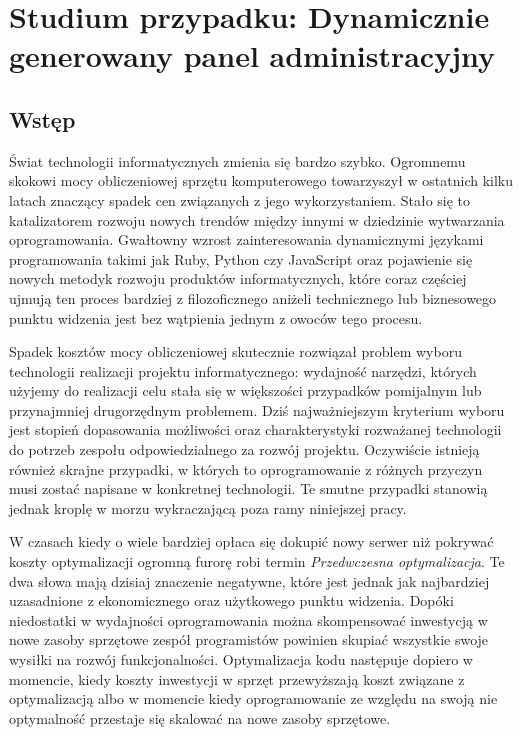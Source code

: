 
\chapter[Studium przypadku: Dynamicznie generowany panel administracyjny]{Studium przypadku: Dynamicznie generowany panel administracyjny}
  \section{Wstęp}
  Świat technologii informatycznych zmienia się bardzo szybko. Ogromnemu skokowi mocy obliczeniowej sprzętu komputerowego towarzyszył w ostatnich kilku latach znaczący spadek cen związanych z jego wykorzystaniem. Stało się to katalizatorem rozwoju nowych trendów między innymi w dziedzinie wytwarzania oprogramowania. Gwałtowny wzrost zainteresowania dynamicznymi językami programowania takimi jak Ruby, Python czy JavaScript oraz pojawienie się nowych metodyk rozwoju produktów informatycznych, które coraz częściej ujmują ten proces bardziej z filozoficznego aniżeli technicznego lub biznesowego punktu widzenia jest bez wątpienia jednym z owoców tego procesu.
  
  Spadek kosztów mocy obliczeniowej skutecznie rozwiązał problem wyboru technologii realizacji projektu informatycznego: wydajność narzędzi, których użyjemy do realizacji celu stała się w większości przypadków pomijalnym lub przynajmniej drugorzędnym problemem. Dziś najważniejszym kryterium wyboru jest stopień dopasowania możliwości oraz charakterystyki rozważanej technologii do potrzeb zespołu odpowiedzialnego za rozwój projektu. Oczywiście istnieją również skrajne przypadki, w których to oprogramowanie z różnych przyczyn musi zostać napisane w konkretnej technologii. Te smutne przypadki stanowią jednak kroplę w morzu wykraczającą poza ramy niniejszej pracy.
  
  W czasach kiedy o wiele bardziej opłaca się dokupić nowy serwer niż pokrywać koszty optymalizacji ogromną furorę robi termin \emph{Przedwczesna optymalizacja}. Te dwa słowa mają dzisiaj znaczenie negatywne, które jest jednak jak najbardziej uzasadnione z ekonomicznego oraz użytkowego punktu widzenia. Dopóki niedostatki w wydajności oprogramowania można skompensować inwestycją w nowe zasoby sprzętowe zespół programistów powinien skupiać wszystkie swoje wysiłki na rozwój funkcjonalności. Optymalizacja kodu następuje dopiero w momencie, kiedy koszty inwestycji w sprzęt przewyższają koszt związane z optymalizacją albo w momencie kiedy oprogramowanie ze względu na swoją nie optymalność przestaje się skalować na nowe zasoby sprzętowe.
  
